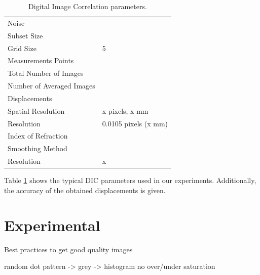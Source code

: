 \documentclass[draft]{svjour3}                     %
\begin{document}
\begin{table}[htbp]
\caption{Digital Image Correlation parameters.}
\label{tab:esterrmagn}
\centering
\begin{tabular}{ll}
Noise & \\
Subset Size & \\
Grid Size 	& 5 \\
Measurements Points & \\
Total Number of Images & \\
Number of Averaged Images & \\
Displacements & \\
\qquad Spatial Resolution & x pixels, x mm \\
\qquad Resolution & 0.0105 pixels (x mm) \\
Index of Refraction & \\
\qquad Smoothing Method & \\
\qquad Resolution & x \\
\end{tabular}
\end{table}

Table \ref{tab:esterrmagn} shows the typical DIC parameters used in our experiments. Additionally, the accuracy of the obtained displacements is given.

\section{Experimental}
\label{sec:exp}
Best practices to get good quality images \cite{sutton2009image} 

random dot pattern -> grey -> histogram no over/under saturation 
\end{document}
